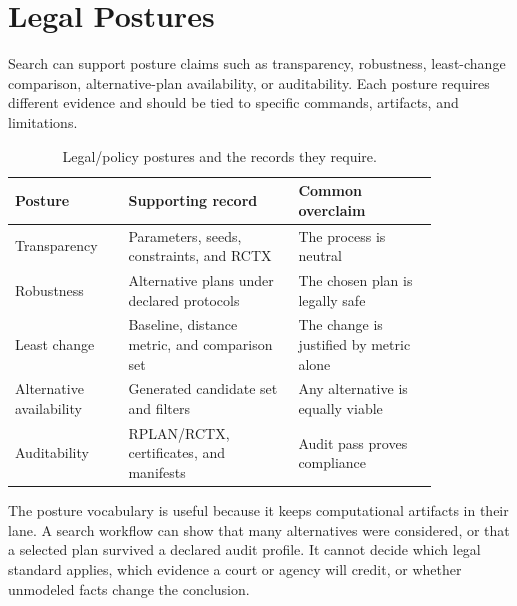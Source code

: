 \section{Legal Postures}

Search can support posture claims such as transparency, robustness,
least-change comparison, alternative-plan availability, or auditability. Each
posture requires different evidence and should be tied to specific commands,
artifacts, and limitations.

\begin{table}[htbp]
\centering
\small
\begin{tabular}{p{0.22\linewidth}p{0.34\linewidth}p{0.28\linewidth}}
\toprule
Posture & Supporting record & Common overclaim \\
\midrule
Transparency & Parameters, seeds, constraints, and RCTX & The process is neutral \\
Robustness & Alternative plans under declared protocols & The chosen plan is legally safe \\
Least change & Baseline, distance metric, and comparison set & The change is justified by metric alone \\
Alternative availability & Generated candidate set and filters & Any alternative is equally viable \\
Auditability & RPLAN/RCTX, certificates, and manifests & Audit pass proves compliance \\
\bottomrule
\end{tabular}
\caption{Legal/policy postures and the records they require.}
\end{table}

The posture vocabulary is useful because it keeps computational artifacts in
their lane. A search workflow can show that many alternatives were considered,
or that a selected plan survived a declared audit profile. It cannot decide
which legal standard applies, which evidence a court or agency will credit, or
whether unmodeled facts change the conclusion.
